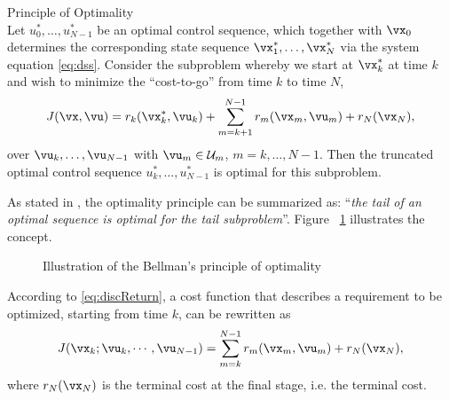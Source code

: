 \begin{teo}{Principle of Optimality \citep{bertsekas2019}
\\} \label{teo:bellmanopt}
    Let $u^*_0, \dots, u^*_{N-1}$ be an optimal control sequence, which together with $\vx_0$ determines the corresponding state sequence $\vx_1^*, \dots, \vx_N^*$ via the system equation \eqref{eq:dss}. Consider the subproblem whereby we start at $\vx_k^*$ at time $k$ and wish to minimize the  ``cost-to-go'' from time $k$ to time  $N$,
     \begin{equation}
       J(\vx,\vu) = r_k(\vx_k^*,\vu_k) + \sum_{m=k+1}^{N-1} r_m(\vx_m,\vu_m) + r_N(\vx_N)
    \label{eq:optPrin},
    \end{equation}
    over $\vu_k, \dots, \vu_{N-1}$ with $\vu_m \in \mathcal{U}_m$, $m=k,\dots,N-1$. Then the truncated optimal control sequence  $u^*_k, \dots, u^*_{N-1}$ is optimal for this subproblem.
\end{teo}
As stated in \textcite{bertsekas2019}, the optimality principle can be summarized as: ``\textit{the tail of an optimal sequence is optimal for the tail subproblem}''. Figure
~\ref{fig:BellmanTail} illustrates the concept.
\begin{figure}[htpb]
    \centering
    
    \caption{Illustration of the Bellman's principle of optimality }%
    \label{fig:BellmanTail}
\end{figure}
According to \eqref{eq:discReturn}, a cost function that describes a requirement to be optimized, starting from time $k$, can be rewritten as 
\begin{equation}
    J(\vx_k;\vu_k, \cdots, \vu_{N-1}) = \sum_{m=k}^{N-1} r_m(\vx_m,\vu_m) + r_N(\vx_N)
\label{eq:costFunctiok},
\end{equation}
where $r_N(\vx_N)$ is the terminal cost at the final stage, i.e. the terminal cost.

